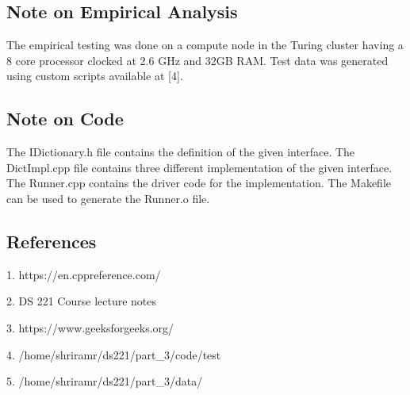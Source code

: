 \documentclass[11pt,a4paper,oneside]{article}
\begin{document}
    \subsection{Note on Empirical Analysis}
    The empirical testing was done on a compute node in the Turing cluster having a 8 core processor clocked at 2.6 GHz and 32GB RAM. Test data was generated using custom scripts available at [4].
    \subsection{Note on Code}
    The IDictionary.h file contains the definition of the given interface. The DictImpl.cpp file contains three different implementation of the given interface.  The Runner.cpp contains the driver code for the implementation. The Makefile can be used to generate the Runner.o file.   
    \subsection{References}
    \begin{list}{}{}
    	\item 1. https://en.cppreference.com/
    	\item 2. DS 221 Course lecture notes
    	\item 3. https://www.geeksforgeeks.org/
    	\item 4. /home/shriramr/ds221/part\_3/code/test
    	\item 5. /home/shriramr/ds221/part\_3/data/
    \end{list}
    
\end{document}

